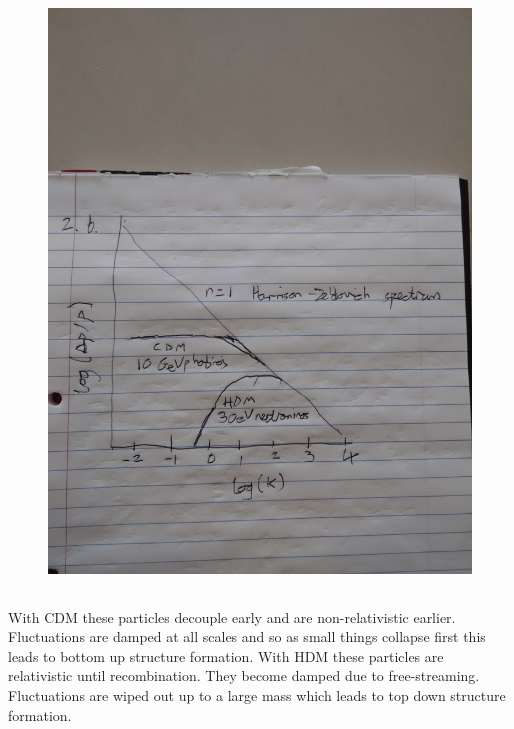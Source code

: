 \documentclass[a4paper,12pt]{article}
\begin{document}
\subsection{}
\begin{figure}[H]
\centering
\includegraphics[width=.9\textwidth]{./pic.jpg}
\caption{}
\label{fig:1}
\end{figure}
\subsection{}
With CDM these particles decouple early and are non-relativistic earlier. Fluctuations are damped at all scales and so as small things collapse first
this leads to bottom up structure formation.
With HDM these particles are relativistic until recombination. They become damped due to free-streaming. Fluctuations are wiped out up to a large mass
which leads to top down structure formation.
\section{}
\end{document}
